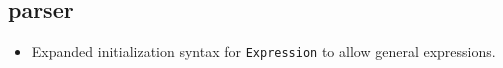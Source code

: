 \documentclass[note]{ResearchNote_pdf}
\begin{document}




\subsection{parser}
\label{changes:parser}
\begin{itemize}
\item Expanded initialization syntax for \texttt{Expression} to allow
  general expressions.
\end{itemize}
\end{document}
